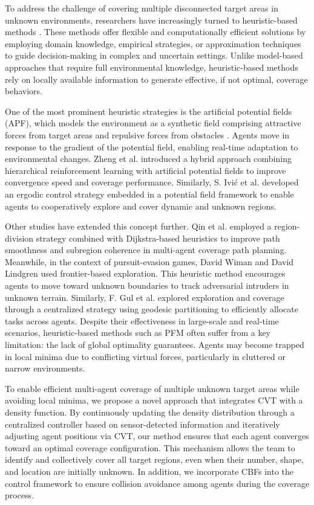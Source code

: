 \documentclass[fleqn,10pt,twocolumn]{main}
\begin{document}
To address the challenge of covering multiple disconnected target areas in unknown environments, researchers have increasingly turned to heuristic-based methods \cite{Pan2022,Shao2024,Shao2025,Zhang2024,Zhang2025}. These methods offer flexible and computationally efficient solutions by employing domain knowledge, empirical strategies, or approximation techniques to guide decision-making in complex and uncertain settings. Unlike model-based approaches that require full environmental knowledge, heuristic-based methods rely on locally available information to generate effective, if not optimal, coverage behaviors.

One of the most prominent heuristic strategies is the artificial potential fields (APF), which models the environment as a synthetic field comprising attractive forces from target areas and repulsive forces from obstacles \cite{Pan2019,Matoui2019,Tallamraju2018,Hamed2022,Lu2025}. Agents move in response to the gradient of the potential field, enabling real-time adaptation to environmental changes. Zheng et al. \cite{Zheng2015} introduced a hybrid approach combining hierarchical reinforcement learning with artificial potential fields to improve convergence speed and coverage performance. Similarly, S. Ivić et al. \cite{Ivic2016} developed an ergodic control strategy embedded in a potential field framework to enable agents to cooperatively explore and cover dynamic and unknown regions.

Other studies have extended this concept further. Qin et al. \cite{Qin2023} employed a region-division strategy combined with Dijkstra-based heuristics to improve path smoothness and subregion coherence in multi-agent coverage path planning. Meanwhile, in the context of pursuit-evasion games, David Wiman and David Lindgren \cite{Wiman2025} used frontier-based exploration. This heuristic method encourages agents to move toward unknown boundaries to track adversarial intruders in unknown terrain. Similarly, F. Gul et al. \cite{Gul2022} explored exploration and coverage through a centralized strategy using geodesic partitioning to efficiently allocate tasks across agents. Despite their effectiveness in large-scale and real-time scenarios, heuristic-based methods such as PFM often suffer from a key limitation: the lack of global optimality guarantees. Agents may become trapped in local minima due to conflicting virtual forces, particularly in cluttered or narrow environments. 

To enable efficient multi-agent coverage of multiple unknown target areas while avoiding local minima, we propose a novel approach that integrates CVT with a density function. By continuously updating the density distribution through a centralized controller based on sensor-detected information and iteratively adjusting agent positions via CVT, our method ensures that each agent converges toward an optimal coverage configuration. This mechanism allows the team to identify and collectively cover all target regions, even when their number, shape, and location are initially unknown. In addition, we incorporate CBFs into the control framework to ensure collision avoidance among agents during the coverage process.
\end{document}
